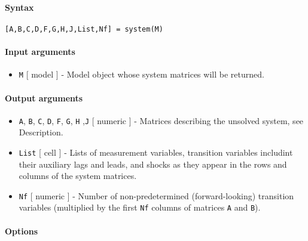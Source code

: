 


	\paragraph{Syntax}

\begin{verbatim}
[A,B,C,D,F,G,H,J,List,Nf] = system(M)
\end{verbatim}

\paragraph{Input arguments}

\begin{itemize}
\itemsep1pt\parskip0pt
\item
  \texttt{M} {[} model {]} - Model object whose system matrices will be
  returned.
\end{itemize}

\paragraph{Output arguments}

\begin{itemize}
\item
  \texttt{A}, \texttt{B}, \texttt{C}, \texttt{D}, \texttt{F},
  \texttt{G}, \texttt{H} ,\texttt{J} {[} numeric {]} - Matrices
  describing the unsolved system, see Description.
\item
  \texttt{List} {[} cell {]} - Lists of measurement variables,
  transition variables includint their auxiliary lags and leads, and
  shocks as they appear in the rows and columns of the system matrices.
\item
  \texttt{Nf} {[} numeric {]} - Number of non-predetermined
  (forward-looking) transition variables (multiplied by the first
  \texttt{Nf} columns of matrices \texttt{A} and \texttt{B}).
\end{itemize}

\paragraph{Options}

